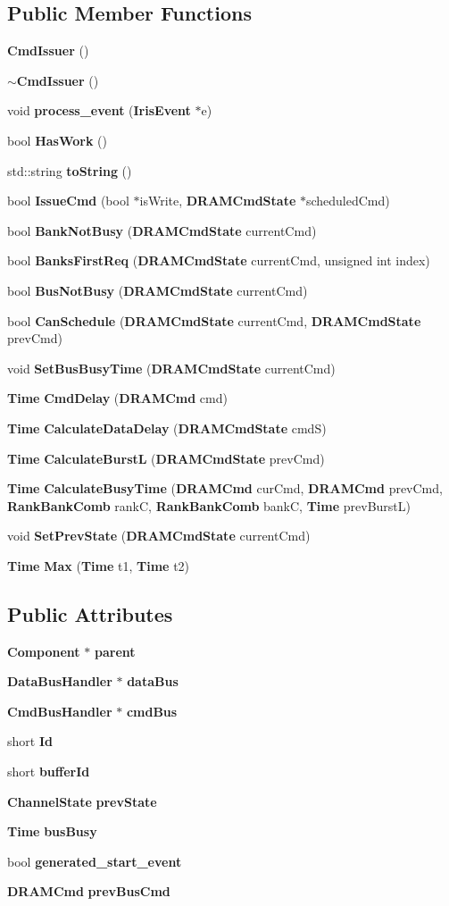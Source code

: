 \subsection*{Public Member Functions}
\begin{CompactItemize}
\item 
{\bf CmdIssuer} ()
\item 
{\bf $\sim$CmdIssuer} ()
\item 
void {\bf process\_\-event} ({\bf IrisEvent} $\ast$e)
\item 
bool {\bf HasWork} ()
\item 
std::string {\bf toString} ()
\item 
bool {\bf IssueCmd} (bool $\ast$isWrite, {\bf DRAMCmdState} $\ast$scheduledCmd)
\item 
bool {\bf BankNotBusy} ({\bf DRAMCmdState} currentCmd)
\item 
bool {\bf BanksFirstReq} ({\bf DRAMCmdState} currentCmd, unsigned int index)
\item 
bool {\bf BusNotBusy} ({\bf DRAMCmdState} currentCmd)
\item 
bool {\bf CanSchedule} ({\bf DRAMCmdState} currentCmd, {\bf DRAMCmdState} prevCmd)
\item 
void {\bf SetBusBusyTime} ({\bf DRAMCmdState} currentCmd)
\item 
{\bf Time} {\bf CmdDelay} ({\bf DRAMCmd} cmd)
\item 
{\bf Time} {\bf CalculateDataDelay} ({\bf DRAMCmdState} cmdS)
\item 
{\bf Time} {\bf CalculateBurstL} ({\bf DRAMCmdState} prevCmd)
\item 
{\bf Time} {\bf CalculateBusyTime} ({\bf DRAMCmd} curCmd, {\bf DRAMCmd} prevCmd, {\bf RankBankComb} rankC, {\bf RankBankComb} bankC, {\bf Time} prevBurstL)
\item 
void {\bf SetPrevState} ({\bf DRAMCmdState} currentCmd)
\item 
{\bf Time} {\bf Max} ({\bf Time} t1, {\bf Time} t2)
\end{CompactItemize}
\subsection*{Public Attributes}
\begin{CompactItemize}
\item 
{\bf Component} $\ast$ {\bf parent}
\item 
{\bf DataBusHandler} $\ast$ {\bf dataBus}
\item 
{\bf CmdBusHandler} $\ast$ {\bf cmdBus}
\item 
short {\bf Id}
\item 
short {\bf bufferId}
\item 
{\bf ChannelState} {\bf prevState}
\item 
{\bf Time} {\bf busBusy}
\item 
bool {\bf generated\_\-start\_\-event}
\item 
{\bf DRAMCmd} {\bf prevBusCmd}
\end{CompactItemize}


